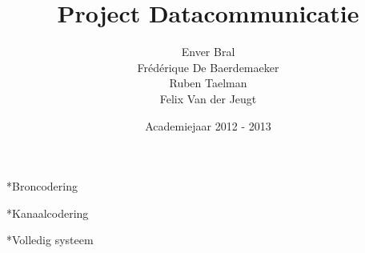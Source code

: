\documentclass[]{article}
\begin{document}
\title{Project Datacommunicatie}
\author{Enver Bral \\ Fr\'ed\'erique De Baerdemaeker \\ Ruben Taelman \\ Felix Van der Jeugt}
\date{Academiejaar 2012 - 2013}
\maketitle

\begin{section}*{Broncodering}
\end{section}
\begin{section}*{Kanaalcodering}
\end{section}
\begin{section}*{Volledig systeem}
\end{section}
\end{document}
